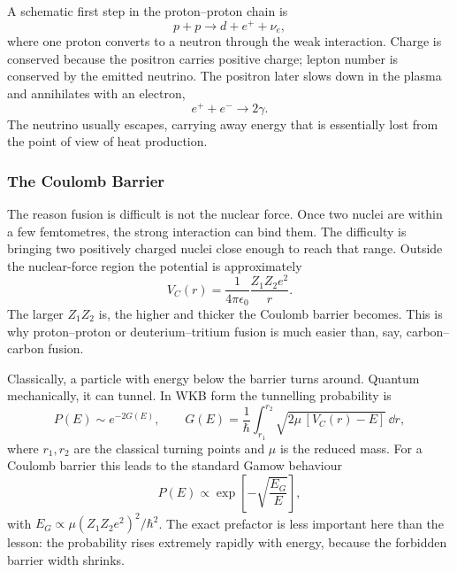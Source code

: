 
A schematic first step in the proton--proton chain is
\begin{equation}
  p+p\longrightarrow d+e^+ + \nu_e,
  \label{eq:lec11:pp_first_step}
\end{equation}
where one proton converts to a neutron through the weak interaction. Charge is
conserved because the positron carries positive charge; lepton number is
conserved by the emitted neutrino. The positron later slows down in the plasma
and annihilates with an electron,
\begin{equation}
  e^+ + e^- \longrightarrow 2\gamma.
\end{equation}
The neutrino usually escapes, carrying away energy that is essentially lost from
the point of view of heat production.

\subsubsection*{The Coulomb Barrier}
The reason fusion is difficult is not the nuclear force. Once two nuclei are
within a few femtometres, the strong interaction can bind them. The difficulty is
bringing two positively charged nuclei close enough to reach that range. Outside
the nuclear-force region the potential is approximately
\begin{equation}
  V_C(r)=\frac{1}{4\pi\epsilon_0}\frac{Z_1Z_2e^2}{r}.
\end{equation}
The larger $Z_1Z_2$ is, the higher and thicker the Coulomb barrier becomes.
This is why proton--proton or deuterium--tritium fusion is much easier than, say,
carbon--carbon fusion.

Classically, a particle with energy below the barrier turns around. Quantum
mechanically, it can tunnel. In WKB form the tunnelling probability is
\begin{equation}
  P(E)\sim e^{-2G(E)},
  \qquad
  G(E)=\frac{1}{\hbar}\int_{r_1}^{r_2}\sqrt{2\mu\,[V_C(r)-E]}\,\dd r,
  \label{eq:lec11:fusion_wkb}
\end{equation}
where $r_1,r_2$ are the classical turning points and $\mu$ is the reduced mass.
For a Coulomb barrier this leads to the standard Gamow behaviour
\begin{equation}
  \boxed{P(E)\propto \exp\left[-\sqrt{\frac{E_G}{E}}\right]},
  \label{eq:lec11:gamow_probability}
\end{equation}
with $E_G\propto \mu (Z_1Z_2e^2)^2/\hbar^2$. The exact prefactor is less
important here than the lesson: the probability rises extremely rapidly with
energy, because the forbidden barrier width shrinks.

